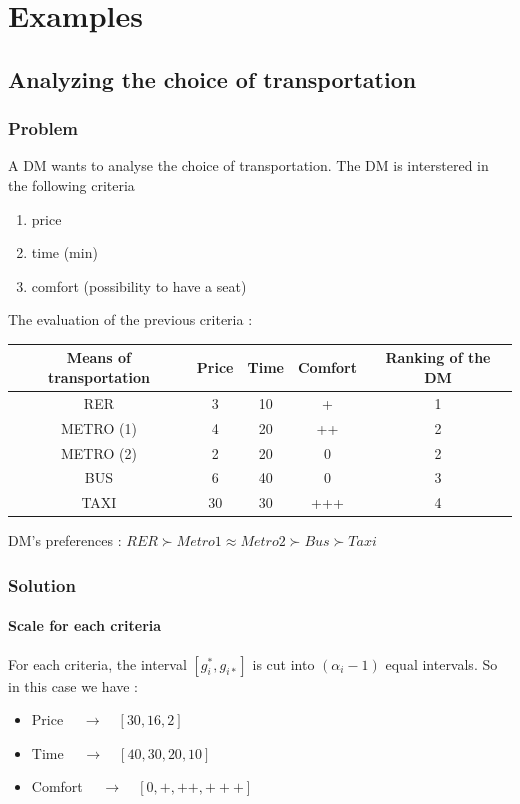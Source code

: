 \documentclass{report}
\begin{document}
\chapter{Examples}
\section{ Analyzing the choice of transportation}
\subsection{Problem}
A DM wants to analyse the choice of transportation. The DM is interstered in the following criteria 
\begin{enumerate}
\item price
\item time (min)
\item comfort (possibility to have a seat)
\end{enumerate}\leavevmode

The evaluation of the previous criteria :
\begin{center}
\begin{tabular}{ |c|c|c|c|c| } 
\hline
Means of transportation & Price & Time & Comfort & Ranking of the DM \\
\hline
RER & 3 & 10 & + & 1 \\
METRO (1) & 4 & 20 & ++ & 2 \\
METRO (2) & 2 & 20 & 0 & 2 \\
BUS & 6 & 40 & 0 & 3 \\
TAXI & 30 & 30 & +++ & 4 \\
\hline
\end{tabular}
\end{center}

DM's preferences : $ RER \succ  Metro1 \approx Metro2  \succ  Bus \succ  Taxi$\\
\newpage
\subsection{Solution}
\subsubsection{Scale for each criteria}
For each criteria, the interval $[g_i^{*}, g_{i*}]$ is cut into $(\alpha _i -1)$ equal intervals. So in this case we have : 
\begin{itemize}
\item Price  $\quad \rightarrow \quad [30, 16, 2]$
\item Time  $\quad \rightarrow \quad [40, 30, 20, 10]$
\item Comfort  $\quad \rightarrow \quad [0, +, ++, +++]$
\end{itemize}
\end{document}
